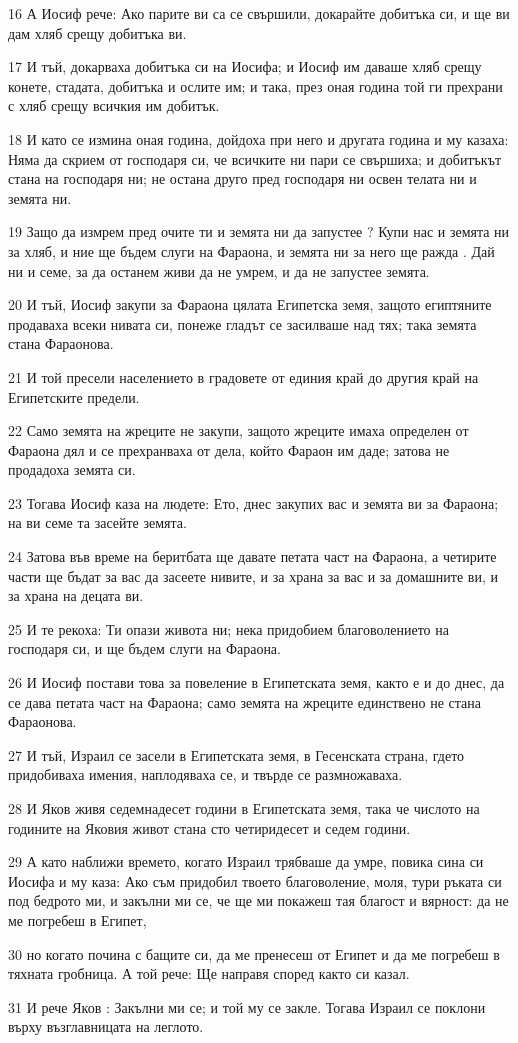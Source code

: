 \par 16 А Иосиф рече: Ако парите ви са се свършили, докарайте добитъка си, и ще ви дам хляб срещу добитъка ви.
\par 17 И тъй, докарваха добитъка си на Иосифа; и Иосиф им даваше хляб срещу конете, стадата, добитъка и ослите им; и така, през оная година той ги прехрани с хляб срещу всичкия им добитък.
\par 18 И като се измина оная година, дойдоха при него и другата година и му казаха: Няма да скрием от господаря си, че всичките ни пари се свършиха; и добитъкът стана на господаря ни; не остана друго пред господаря ни освен телата ни и земята ни.
\par 19 Защо да измрем пред очите ти и земята ни да запустее ? Купи нас и земята ни за хляб, и ние ще бъдем слуги на Фараона, и земята ни за него ще ражда . Дай ни и семе, за да останем живи да не умрем, и да не запустее земята.
\par 20 И тъй, Иосиф закупи за Фараона цялата Египетска земя, защото египтяните продаваха всеки нивата си, понеже гладът се засилваше над тях; така земята стана Фараонова.
\par 21 И той пресели населението в градовете от единия край до другия край на Египетските предели.
\par 22 Само земята на жреците не закупи, защото жреците имаха определен от Фараона дял и се прехранваха от дела, който Фараон им даде; затова не продадоха земята си.
\par 23 Тогава Иосиф каза на людете: Ето, днес закупих вас и земята ви за Фараона; на ви семе та засейте земята.
\par 24 Затова във време на беритбата ще давате петата част на Фараона, а четирите части ще бъдат за вас да засеете нивите, и за храна за вас и за домашните ви, и за храна на децата ви.
\par 25 И те рекоха: Ти опази живота ни; нека придобием благоволението на господаря си, и ще бъдем слуги на Фараона.
\par 26 И Иосиф постави това за повеление в Египетската земя, както е и до днес, да се дава петата част на Фараона; само земята на жреците единствено не стана Фараонова.
\par 27 И тъй, Израил се засели в Египетската земя, в Гесенската страна, гдето придобиваха имения, наплодяваха се, и твърде се размножаваха.
\par 28 И Яков живя седемнадесет години в Египетската земя, така че числото на годините на Яковия живот стана сто четиридесет и седем години.
\par 29 А като наближи времето, когато Израил трябваше да умре, повика сина си Иосифа и му каза: Ако съм придобил твоето благоволение, моля, тури ръката си под бедрото ми, и закълни ми се, че ще ми покажеш тая благост и вярност: да не ме погребеш в Египет,
\par 30 но когато почина с бащите си, да ме пренесеш от Египет и да ме погребеш в тяхната гробница. А той рече: Ще направя според както си казал.
\par 31 И рече Яков : Закълни ми се; и той му се закле. Тогава Израил се поклони върху възглавницата на леглото.

